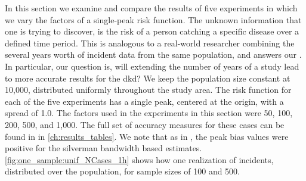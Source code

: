 In this section we examine and compare the results of five experiments in which we vary the \glspl{factor}
of a single-peak risk function.
The unknown information that one is trying to discover,
is the risk of a person catching a specific disease over a defined time period.
This is analogous to a real-world researcher combining the several years worth of incident data from the same population,
and answers our .
In particular,
our question is,
will extending the number of years of a study lead to more accurate results for the \gls{dkd}?
We keep the population size constant at 10,000, distributed uniformly throughout the study area.
The risk function for each of the five experiments has a single peak,
centered at the origin,
with a \gls{spread} of 1.0.
The \glspl{factor} used in the experiments in this section were 50, 100, 200, 500, and 1,000.
The full set of accuracy measures for these cases can be found in  in \autoref{ch:results_tables}.
We note that as in , the \gls{peak bias} values were positive for the \gls{silverman} bandwidth based estimates.
\autoref{fig:one_sample:unif_NCases_1h} shows how one realization of incidents, distributed over the population, for sample sizes of 100 and 500.

